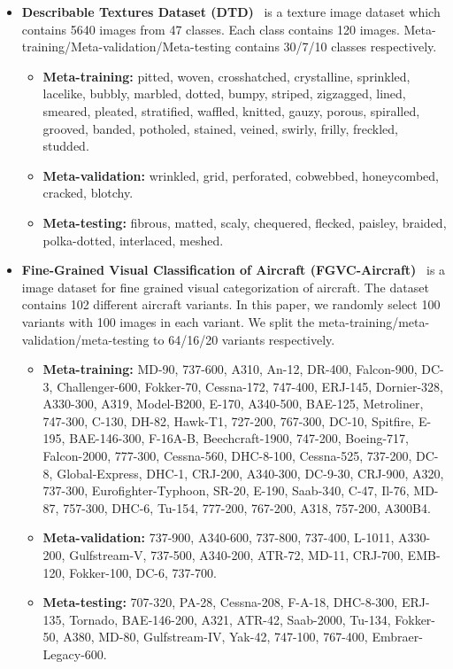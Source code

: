 \documentclass{article}
\begin{document}
\begin{itemize}[leftmargin=*]
\begin{itemize}
    \end{itemize}
    \item \textbf{Describable Textures Dataset (DTD)}~\cite{cimpoi14describing} is a texture image dataset which contains 5640 images from 47 classes. Each class contains 120 images. Meta-training/Meta-validation/Meta-testing contains 30/7/10 classes respectively. 
    \begin{itemize}
    \small
        \item \textbf{Meta-training:} pitted, woven, crosshatched, crystalline, sprinkled, lacelike, bubbly, marbled, dotted, bumpy, striped, zigzagged, lined, smeared, pleated, stratified, waffled, knitted, gauzy, porous, spiralled, grooved, banded, potholed, stained, veined, swirly, frilly, freckled, studded. 
        \item \textbf{Meta-validation:} wrinkled, grid, perforated, cobwebbed, honeycombed, cracked, blotchy.
        \item \textbf{Meta-testing:} fibrous, matted, scaly, chequered, flecked, paisley, braided, polka-dotted, interlaced, meshed.
    \end{itemize}
    \item \textbf{Fine-Grained Visual Classification of Aircraft (FGVC-Aircraft)}~\cite{maji13fine-grained} is a image dataset for fine grained visual categorization of aircraft. The dataset contains 102 different aircraft variants. In this paper, we randomly select 100 variants with 100 images in each variant. We split the meta-training/meta-validation/meta-testing to 64/16/20 variants respectively.
    \begin{itemize}
    \small
        \item \textbf{Meta-training:} MD-90, 737-600, A310, An-12, DR-400, Falcon-900, DC-3, Challenger-600, Fokker-70, Cessna-172, 747-400, ERJ-145, Dornier-328, A330-300, A319, Model-B200, E-170, A340-500, BAE-125, Metroliner, 747-300, C-130, DH-82, Hawk-T1, 727-200, 767-300, DC-10, Spitfire, E-195, BAE-146-300, F-16A-B, Beechcraft-1900, 747-200, Boeing-717, Falcon-2000, 777-300, Cessna-560, DHC-8-100, Cessna-525, 737-200, DC-8, Global-Express, DHC-1, CRJ-200, A340-300, DC-9-30, CRJ-900, A320, 737-300, Eurofighter-Typhoon, SR-20, E-190, Saab-340, C-47, Il-76, MD-87, 757-300, DHC-6, Tu-154, 777-200, 767-200, A318, 757-200, A300B4.
        \item \textbf{Meta-validation:} 737-900, A340-600, 737-800, 737-400, L-1011, A330-200, Gulfstream-V, 737-500, A340-200, ATR-72, MD-11, CRJ-700, EMB-120, Fokker-100, DC-6, 737-700.
        \item \textbf{Meta-testing:} 707-320, PA-28, Cessna-208, F-A-18, DHC-8-300, ERJ-135, Tornado, BAE-146-200, A321, ATR-42, Saab-2000, Tu-134, Fokker-50, A380, MD-80, Gulfstream-IV, Yak-42, 747-100, 767-400, Embraer-Legacy-600.

\end{itemize}
\end{itemize}
\end{document}
